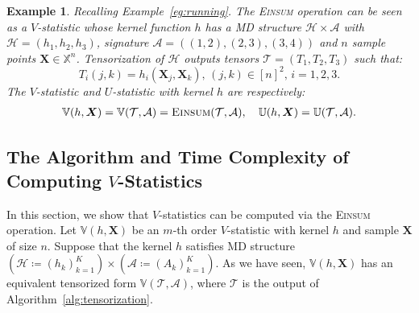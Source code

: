 \documentclass[twoside,11pt]{article}
\def\Einsum{\textsc{Einsum}}
\newtheorem{subexample}{Example}
\newcommand{\pdfv}{\texorpdfstring{$V$}{V}}
\newcommand{\ustat}{\mathbb{U}}
\newcommand{\vstat}{\mathbb{V}}
\newcommand{\samplespace}{\bbX}
\def\bbX{\mathbb{X}}
\def\bbR{\mathbb{R}}
\def\calA{\mathcal{A}}
\def\calT{\mathcal{T}}
\def\calH{\mathcal{H}}
\begin{document}
\setcounter{example}{3}
\begin{subexample}
\label{eg:running-a}
Recalling Example~\ref{eg:running}. The \Einsum{} operation can be seen as a $V$-statistic whose kernel function $h$ has a MD structure $\calH \times \calA$ with $\calH = (h_1, h_2, h_3)$, signature $\calA = ( (1,2),(2,3),(3,4))$ and $n$ sample points $\bm{X} \in \samplespace^{n}$. Tensorization of $\calH$ outputs tensors $\calT = ( T_1, T_2, T_3)$ such that:
\begin{equation*}
T_i (j,k) = h_i (\bm{X}_{j}, \bm{X}_{k}),  \, (j,k) \in [n]^2,  \, i = 1,2,3.
\end{equation*}
The $V$-statistic and $U$-statistic with kernel $h$ are respectively:
\begin{align*}
\vstat(h, \bm{X}) = \vstat (\calT, \calA) = \Einsum{}(\calT, \calA), \quad \ustat(h, \bm{X}) = \ustat(\calT, \calA).
\end{align*}
\end{subexample}

\subsection{The Algorithm and Time Complexity of Computing \pdfv{}-Statistics}
\label{sec:alg_v}

In this section, we show that $V$-statistics can be computed via the \Einsum{} operation. Let $\vstat(h, \bm{X})$ be an $m$-th order $V$-statistic with kernel $h$ and sample $\bm{X}$ of size $n$. Suppose that the kernel $h$ satisfies MD structure $(\calH \coloneqq (h_k)_{k=1}^K) \times (\calA \coloneqq (A_k)_{k=1}^K)$. As we have seen, $\vstat(h, \bm{X})$ has an equivalent tensorized form $\vstat(\calT, \calA)$, where $\calT$ is the output of Algorithm~\ref{alg:tensorization}. 
\end{document}

